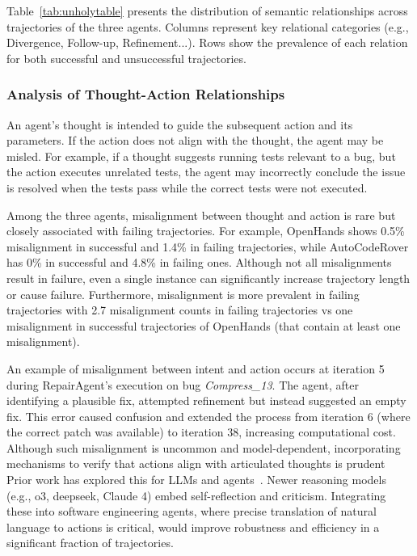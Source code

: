 \documentclass[conference,10pt]{IEEEtran}
\theoremstyle{definition}        %
\newcommand{\ra}{Repair\-Agent}
\newcommand{\oh}{Open\-Hands}
\newcommand{\acr}{Auto\-Code\-Rover}
\begin{document}
Table~\ref{tab:unholytable} presents the distribution of semantic relationships across trajectories of the three agents.
Columns represent key relational categories (e.g., Divergence, Follow-up, Refinement...).
Rows show the prevalence of each relation for both successful and unsuccessful trajectories.



\subsubsection{\textbf{Analysis of Thought-Action Relationships}}
An agent's thought is intended to guide the subsequent action and its parameters.
If the action does not align with the thought, the agent may be misled. For example, if a thought suggests running tests relevant to a bug, but the action executes unrelated tests, the agent may incorrectly conclude the issue is resolved when the tests pass while the correct tests were not executed.


Among the three agents, misalignment between thought and action is rare but closely associated with failing trajectories.
For example, \oh{} shows 0.5\% misalignment in successful and 1.4\% in failing trajectories, while \acr{} has 0\% in successful and 4.8\% in failing ones.
Although not all misalignments result in failure, even a single instance can significantly increase trajectory length or cause failure.
Furthermore, misalignment is more prevalent in failing trajectories with 2.7 misalignment counts in failing trajectories vs one misalignment in successful trajectories of OpenHands (that contain at least one misalignment).

An example of misalignment between intent and action occurs at iteration 5 during \ra{}'s execution on bug \textit{Compress\_13}.
The agent, after identifying a plausible fix, attempted refinement but instead suggested an empty fix.
This error caused confusion and extended the process from iteration 6 (where the correct patch was available) to iteration 38, increasing computational cost.
Although such misalignment is uncommon and model-dependent, incorporating mechanisms to verify that actions align with articulated thoughts is prudent
Prior work has explored this for LLMs and agents~\cite{valmeekam2023can, gou2023critic}.
Newer reasoning models (e.g., o3, deepseek, Claude 4) embed self-reflection and criticism.
Integrating these into software engineering agents, where precise translation of natural language to actions is critical, would improve robustness and efficiency in a significant fraction of trajectories.
\end{document}
